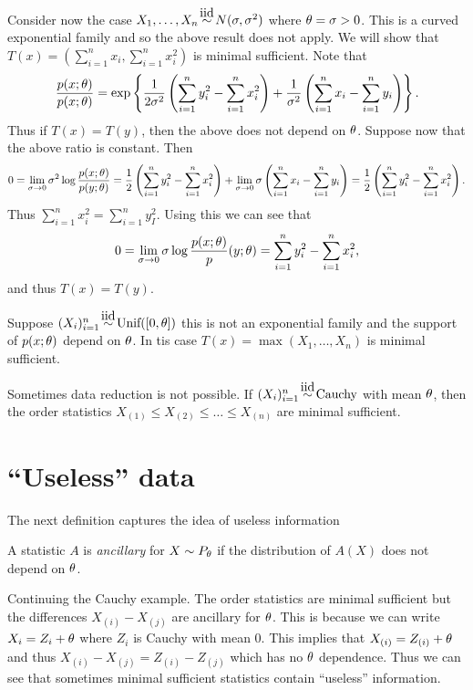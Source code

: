 \begin{ex}
        Consider now the case $X_1,\ldots, X_n \iid N(\sigma, \sigma^2)$ where ${\theta} = \sigma > 0$. This is a curved exponential family and so the above result does not apply. We will show that $T(x) = \left(\sum_{i=1}^n x_i, \sum_{i=1}^n x_i^2\right)$ is minimal sufficient. Note that 
        \[\frac{p(x;{\theta})}{p(x;{\theta})} = \exp\left\{\frac{1}{2\sigma^2}\left(\sum_{i=1}^n y_i^2 - \sum_{i=1}^n x_i^2\right)+\frac{1}{\sigma^2}\left(\sum_{i=1}^n x_i - \sum_{i=1}^n y_i\right)\right\}. \]
        Thus if $T(x) = T(y)$, then the above does not depend on ${\theta}$. Suppose now that the above ratio is constant. Then 
        \[ 0=\lim_{\sigma \to 0}\sigma^2 \log\frac{p(x;{\theta})}{p(y;{\theta})} = \frac{1}{2}\left( \sum_{i=1}^n y_i^2-\sum_{i=1}^n x_i^2\right)+\lim_{\sigma \to 0} \sigma\left(\sum_{i=1}^n x_i -\sum_{i=1}^n y_i\right) = \frac{1}{2}\left( \sum_{i=1}^n y_i^2-\sum_{i=1}^n x_i^2\right). \]
        Thus $\sum_{i=1}^n x_i^2 = \sum_{i=1}^n y_I^2$. Using this we can see that 
        \[0 =\lim_{\sigma \to 0} \sigma \log{\frac{p(x;{\theta})}p(y;{\theta})} =  \sum_{i=1}^n y_i^2-\sum_{i=1}^n x_i^2,\]
        and thus $T(x) = T(y)$. 
\end{ex}
\begin{ex}
    Suppose $(X_i)_{i=1}^n \iid \text{Unif}([0,\ta])$ this is not an exponential family and the support of $p(x;{\theta})$ depend on ${\theta}$. In tis case $T(x) = \max(X_1,\ldots, X_n)$ is minimal sufficient.
\end{ex}
\begin{ex}
    Sometimes data reduction is not possible. If $(X_i)_{i=1}^n \iid \text{Cauchy}$ with mean ${\theta}$, then the order statistics $X_{(1)} \le X_{(2)} \le \ldots \le X_{(n)}$ are minimal sufficient.
\end{ex}

\section{``Useless'' data}
The next definition captures the idea of useless information

\begin{defn}
    A statistic $A$ is \emph{ancillary} for $X \sim P_{\theta}$ if the distribution of $A(X)$ does not depend on ${\theta}$.
\end{defn}
\begin{ex}
    Continuing the Cauchy example. The order statistics are minimal sufficient but the differences $X_{(i)} - X_{(j)}$ are ancillary for ${\theta}$. This is because we can write $X_i = Z_i +{\theta}$ where $Z_i$ is Cauchy with mean 0. This implies that $X_{(i)} = Z_{(i)}+{\theta}$ and thus $X_{(i)}-X_{(j)} = Z_{(i)}-Z_{(j)}$ which has no ${\theta}$ dependence. Thus we can see that sometimes minimal sufficient statistics contain ``useless'' information.
\end{ex}

